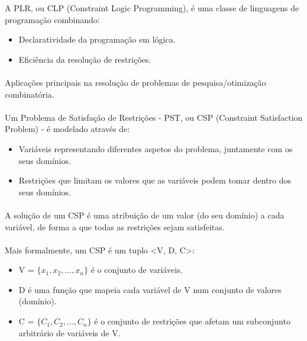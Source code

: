 \documentclass[../resumosPLOG.tex]{subfiles}
\begin{document}
 

A PLR, ou CLP (Constraint Logic Programming), é uma classe de linguagens de programação combinando:
\begin{itemize}
    \item Declaratividade da programação em lógica.
    \item Eficiência da resolução de restrições.
\end{itemize}

\paragraph{}

Aplicações principais na resolução de problemas de pesquisa/otimização combinatória.

\paragraph{}

Um Problema de Satisfação de Restrições - PST, ou CSP (Constraint Satisfaction Problem) - é modelado através de:
\begin{itemize}
    \item Variáveis representando diferentes aspetos do problema, juntamente com os seus domínios.
    \item Restrições que limitam os valores que as variáveis podem tomar dentro dos seus domínios.
\end{itemize}

\paragraph{}

A solução de um CSP é uma atribuição de um valor (do seu domínio) a cada variável, de forma a que todas as restrições sejam satisfeitas.

\paragraph{}

Mais formalmente, um CSP é um tuplo <V, D, C>:
\begin{itemize}
    \item V = \(\{x_1, x_2, ..., x_n\}\) é o conjunto de variáveis.
    \item D é uma função que mapeia cada variável de V num conjunto de valores (domínio).
    \item C = \(\{C_1, C_2, ..., C_n\}\) é o conjunto de restrições que afetam um subconjunto arbitrário de variáveis de V.
\end{itemize}
\end{document}

